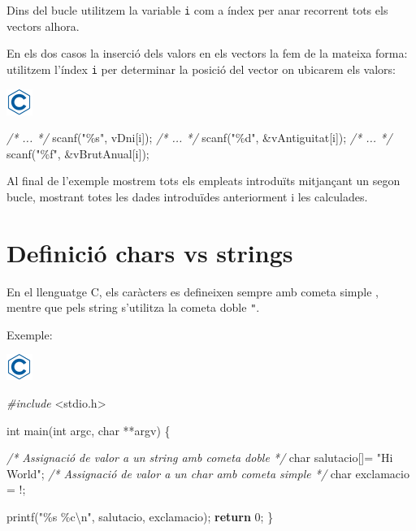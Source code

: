 \documentclass[]{book}
\newenvironment{Shaded}{\begin{snugshade}}{\end{snugshade}}
\newcommand{\CharTok}[1]{\textcolor[rgb]{0.31,0.60,0.02}{#1}}
\newcommand{\CommentTok}[1]{\textcolor[rgb]{0.56,0.35,0.01}{\textit{#1}}}
\newcommand{\ControlFlowTok}[1]{\textcolor[rgb]{0.13,0.29,0.53}{\textbf{#1}}}
\newcommand{\DataTypeTok}[1]{\textcolor[rgb]{0.13,0.29,0.53}{#1}}
\newcommand{\DecValTok}[1]{\textcolor[rgb]{0.00,0.00,0.81}{#1}}
\newcommand{\ImportTok}[1]{#1}
\newcommand{\NormalTok}[1]{#1}
\newcommand{\PreprocessorTok}[1]{\textcolor[rgb]{0.56,0.35,0.01}{\textit{#1}}}
\newcommand{\SpecialCharTok}[1]{\textcolor[rgb]{0.00,0.00,0.00}{#1}}
\newcommand{\StringTok}[1]{\textcolor[rgb]{0.31,0.60,0.02}{#1}}
\begin{document}
Dins del bucle utilitzem la variable \texttt{i} com a índex per anar recorrent tots els vectors alhora.

En els dos casos la inserció dels valors en els vectors la fem de la mateixa forma: utilitzem l'índex \texttt{i} per determinar la posició del vector on ubicarem els valors:

\includegraphics{./img/c.png}

\begin{Shaded}
\begin{Highlighting}[]
\CommentTok{/* ... */}
\NormalTok{scanf(}\StringTok{"\%s"}\NormalTok{, vDni[i]);}
\CommentTok{/* ... */}
\NormalTok{scanf(}\StringTok{"\%d"}\NormalTok{, \&vAntiguitat[i]);}
\CommentTok{/* ... */}
\NormalTok{scanf(}\StringTok{"\%f"}\NormalTok{, \&vBrutAnual[i]);}
\end{Highlighting}
\end{Shaded}

Al final de l'exemple mostrem tots els empleats introduïts mitjançant un segon bucle, mostrant totes les dades introduïdes anteriorment i les calculades.

\hypertarget{definicio-chars-vs-strings}{%
\section{Definició chars vs strings}\label{definicio-chars-vs-strings}}

En el llenguatge C, els caràcters es defineixen sempre amb cometa simple \texttt{\textquotesingle{}}, mentre que pels string s'utilitza la cometa doble \texttt{"}.

Exemple:

\includegraphics{./img/c.png}

\begin{Shaded}
\begin{Highlighting}[]
\PreprocessorTok{\#include }\ImportTok{\textless{}stdio.h\textgreater{}}

\DataTypeTok{int}\NormalTok{ main(}\DataTypeTok{int}\NormalTok{ argc, }\DataTypeTok{char}\NormalTok{ **argv) \{}
    
    \CommentTok{/* Assignació de valor a un string amb cometa doble */}
    \DataTypeTok{char}\NormalTok{ salutacio[]= }\StringTok{"Hi World"}\NormalTok{;}
    \CommentTok{/* Assignació de valor a un char amb cometa simple */}
    \DataTypeTok{char}\NormalTok{ exclamacio = }\CharTok{\textquotesingle{}!\textquotesingle{}}\NormalTok{;}
    
\NormalTok{    printf(}\StringTok{"\%s \%c}\SpecialCharTok{\textbackslash{}n}\StringTok{"}\NormalTok{, salutacio, exclamacio);}
    \ControlFlowTok{return} \DecValTok{0}\NormalTok{;}
\NormalTok{\}}
\end{Highlighting}
\end{Shaded}
\end{document}
